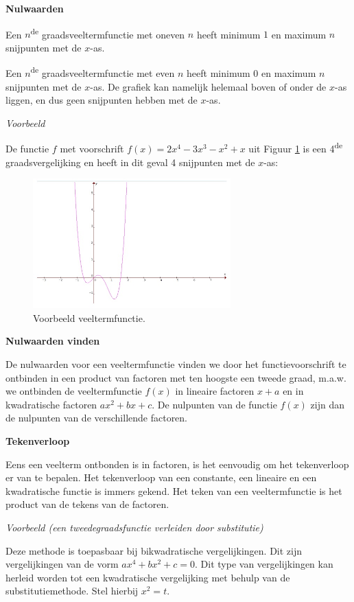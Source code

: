 \textbf{Nulwaarden}

\noindent Een $n$\textsuperscript{de} graadsveeltermfunctie met oneven
$n$ heeft minimum $1$ en maximum $n$ snijpunten met de $x$-as.

\noindent Een $n$\textsuperscript{de} graadsveeltermfunctie met even
$n$ heeft minimum $0$ en maximum $n$ snijpunten met de $x$-as. De grafiek
kan namelijk helemaal boven of onder de $x$-as liggen, en dus geen
snijpunten hebben met de $x$-as.

\emph{Voorbeeld}

De functie $f$ met voorschrift $f(x)=2x^{4}-3x^{3}-x^{2}+x$ uit Figuur \ref{fig:vt:vb1}
is een 4\textsuperscript{de} graadsvergelijking en heeft in dit geval
4 snijpunten met de $x$-as:

\begin{figure}[h]
\centering{}\includegraphics[height=5cm]{2_elem_rekenvaardigheden_B/inputs/veeltermfuncties3.jpg} 
\caption{Voorbeeld veeltermfunctie.}
\label{fig:vt:vb1}
\end{figure}

\textbf{Nulwaarden vinden}

De nulwaarden voor een veeltermfunctie vinden we door het
functievoorschrift te ontbinden in een product van factoren met ten
hoogste een tweede graad, m.a.w. we ontbinden de veeltermfunctie $f(x)$
in lineaire factoren $x+a$ en in kwadratische factoren $ax^{2}+bx+c$.
De nulpunten van de functie $f(x)$ zijn dan de nulpunten van de verschillende
factoren.

\textbf{Tekenverloop}

Eens een veelterm ontbonden is in factoren, is het eenvoudig
om het tekenverloop er van te bepalen. Het tekenverloop van een constante,
een lineaire en een kwadratische functie is immers gekend. Het teken
van een veeltermfunctie is het product van de tekens van de factoren.


\emph{Voorbeeld (een tweedegraadsfunctie verleiden door substitutie)}

Deze methode is toepasbaar bij bikwadratische vergelijkingen. Dit
zijn vergelijkingen van de vorm $ax^{4}+bx^{2}+c=0$. Dit type van
vergelijkingen kan herleid worden tot een kwadratische vergelijking
met behulp van de substitutiemethode. Stel hierbij $x^{2}=t$.

